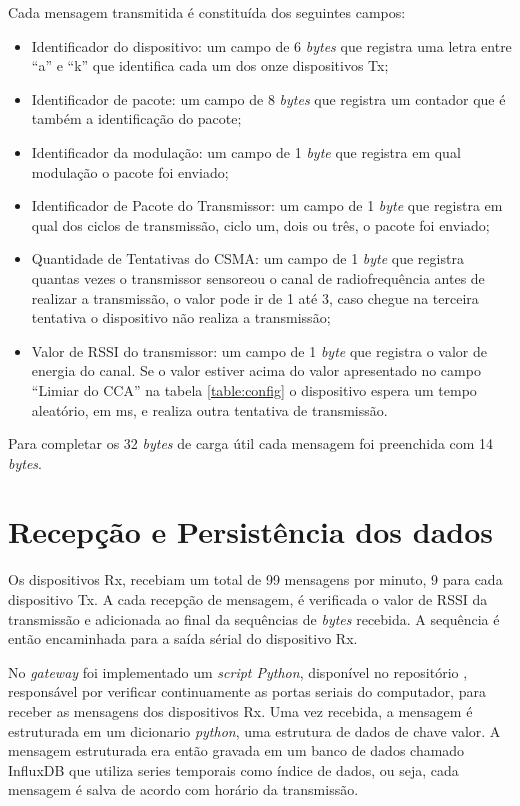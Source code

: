 Cada mensagem transmitida é constituída dos seguintes campos:
\begin{itemize}
    \item Identificador do dispositivo: um campo de 6 \emph{bytes} que registra uma letra entre ``a'' e ``k'' que identifica cada um dos onze dispositivos Tx;
    \item Identificador de pacote: um campo de 8 \emph{bytes} que registra um contador que é também a identificação do pacote;
    \item Identificador da modulação: um campo de 1 \emph{byte} que registra em qual modulação o pacote foi enviado;
    \item Identificador de Pacote do Transmissor: um campo de 1 \emph{byte} que registra em qual dos ciclos de transmissão, ciclo um, dois ou três, o pacote foi enviado;
    \item Quantidade de Tentativas do CSMA: um campo de 1 \emph{byte} que registra quantas vezes o transmissor sensoreou o canal de radiofrequência antes de realizar a transmissão, o valor pode ir de 1 até 3, caso chegue na terceira tentativa o dispositivo não realiza a transmissão;
    \item Valor de RSSI do transmissor: um campo de 1 \emph{byte} que registra o valor de energia do canal. Se o valor estiver acima do valor apresentado no campo ``Limiar do CCA'' na tabela \ref{table:config} o dispositivo espera um tempo aleatório, em ms, e realiza outra tentativa de transmissão.
\end{itemize}

Para completar os 32 \emph{bytes} de carga útil cada mensagem foi preenchida com 14 \emph{bytes}.

\section{Recepção e Persistência dos dados}
Os dispositivos Rx, recebiam um total de 99 mensagens por minuto, 9 para cada dispositivo Tx. A cada recepção de mensagem, é verificada o valor de RSSI da transmissão e adicionada ao final da sequências de \emph{bytes} recebida. A sequência é então encaminhada para a saída sérial do dispositivo Rx.

No \emph{gateway} foi implementado um \emph{script Python}, disponível no repositório \cite{openmoteb-serialReader}, responsável por verificar continuamente as portas seriais do computador, para receber as mensagens dos dispositivos Rx. Uma vez recebida, a mensagem é estruturada em um dicionario \emph{python}, uma estrutura de dados de chave valor. A mensagem estruturada era então gravada em um banco de dados chamado InfluxDB que utiliza series temporais como índice de dados, ou seja, cada mensagem é salva de acordo com horário da transmissão.